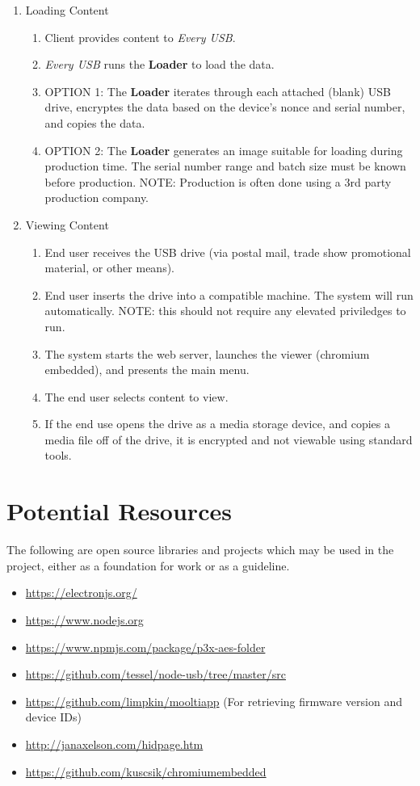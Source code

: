 \documentclass{article}
\begin{document}
\begin{enumerate}
\item Loading Content
    \begin{enumerate}
    \item Client provides content to {\it Every USB}.
    \item {\it Every USB} runs the {\bf Loader} to load the data.
    \item OPTION 1: The {\bf Loader} iterates through each attached
          (blank) USB drive, encryptes the data based on the device's nonce
          and serial number, and copies the data.
    \item OPTION 2: The {\bf Loader} generates an image suitable for
          loading during production time.  The serial number range and
          batch size must be known before production.  NOTE: Production
          is often done using a 3rd party production company.
    \end{enumerate}

\item Viewing Content
    \begin{enumerate}
    \item End user receives the USB drive (via postal mail, trade show 
          promotional material, or other means).
    \item End user inserts the drive into a compatible machine.  The 
          system will run automatically.  NOTE: this should not require
          any elevated priviledges to run.
    \item The system starts the web server, launches the viewer (chromium
          embedded), and presents the main menu.
    \item The end user selects content to view.
    \item If the end use opens the drive as a media storage device, and 
          copies a media file off of the drive, it is encrypted and not
          viewable using standard tools.
    \end{enumerate}

\end{enumerate}

\section{Potential Resources}
The following are open source libraries and projects which may be used in the
project, either as a foundation for work or as a guideline.
\begin{itemize}
\item \url{https://electronjs.org/}
\item \url{https://www.nodejs.org}
\item \url{https://www.npmjs.com/package/p3x-aes-folder}
\item \url{https://github.com/tessel/node-usb/tree/master/src}
\item \url{https://github.com/limpkin/mooltiapp} (For retrieving 
      firmware version and device IDs)
\item \url{http://janaxelson.com/hidpage.htm}
\item \url{https://github.com/kuscsik/chromiumembedded}
\end{itemize}
\end{document}
